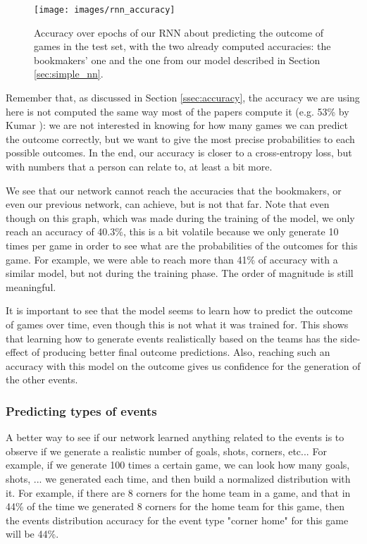 \documentclass[10pt,conference,onecolumn]{IEEEtran}
\begin{document}
\begin{figure}[H]
\centering
\texttt{[image: images/rnn\_accuracy]}
\caption{Accuracy over epochs of our RNN about predicting the outcome of games in the test set, with the two already computed accuracies: the bookmakers' one and the one from our model described in Section \ref{sec:simple_nn}.}
\label{fig:rnn_accuracy}
\end{figure}

Remember that, as discussed in Section \ref{ssec:accuracy}, the accuracy we are using here is not computed the same way most of the papers compute it (e.g. 53\% by Kumar \cite{ml_kumar}): we are not interested in knowing for how many games we can predict the outcome correctly, but we want to give the most precise probabilities to each possible outcomes. In the end, our accuracy is closer to a cross-entropy loss, but with numbers that a person can relate to, at least a bit more.

We see that our network cannot reach the accuracies that the bookmakers, or even our previous network, can achieve, but is not that far. Note that even though on this graph, which was made during the training of the model, we only reach an accuracy of 40.3\%, this is a bit volatile because we only generate 10 times per game in order to see what are the probabilities of the outcomes for this game. For example, we were able to reach more than 41\% of accuracy with a similar model, but not during the training phase. The order of magnitude is still meaningful.

It is important to see that the model seems to learn how to predict the outcome of games over time, even though this is not what it was trained for. This shows that learning how to generate events realistically based on the teams has the side-effect of producing better final outcome predictions. Also, reaching such an accuracy with this model on the outcome gives us confidence for the generation of the other events.
\newline

\subsubsection{Predicting types of events}
A better way to see if our network learned anything related to the events is to observe if we generate a realistic number of goals, shots, corners, etc... For example, if we generate 100 times a certain game, we can look how many goals, shots, ... we generated each time, and then build a normalized distribution with it. For example, if there are 8 corners for the home team in a game, and that in 44\% of the time we generated 8 corners for the home team for this game, then the events distribution accuracy for the event type "corner home" for this game will be 44\%.
\end{document}
